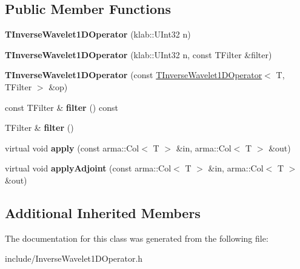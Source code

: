 \subsection*{Public Member Functions}
\begin{DoxyCompactItemize}
\item 
{\bfseries T\+Inverse\+Wavelet1\+D\+Operator} (klab\+::\+U\+Int32 n)\hypertarget{classkl1p_1_1TInverseWavelet1DOperator_aafb2a8284afd6de69ebaf2a465cd88ba}{}\label{classkl1p_1_1TInverseWavelet1DOperator_aafb2a8284afd6de69ebaf2a465cd88ba}

\item 
{\bfseries T\+Inverse\+Wavelet1\+D\+Operator} (klab\+::\+U\+Int32 n, const T\+Filter \&filter)\hypertarget{classkl1p_1_1TInverseWavelet1DOperator_a302bc8fe7d78d336931075f483591779}{}\label{classkl1p_1_1TInverseWavelet1DOperator_a302bc8fe7d78d336931075f483591779}

\item 
{\bfseries T\+Inverse\+Wavelet1\+D\+Operator} (const \hyperlink{classkl1p_1_1TInverseWavelet1DOperator}{T\+Inverse\+Wavelet1\+D\+Operator}$<$ T, T\+Filter $>$ \&op)\hypertarget{classkl1p_1_1TInverseWavelet1DOperator_ac9f909ea169de95fa10ae30df01d214b}{}\label{classkl1p_1_1TInverseWavelet1DOperator_ac9f909ea169de95fa10ae30df01d214b}

\item 
const T\+Filter \& {\bfseries filter} () const \hypertarget{classkl1p_1_1TInverseWavelet1DOperator_a0475beea8d54d65f43d65b6f2b77f559}{}\label{classkl1p_1_1TInverseWavelet1DOperator_a0475beea8d54d65f43d65b6f2b77f559}

\item 
T\+Filter \& {\bfseries filter} ()\hypertarget{classkl1p_1_1TInverseWavelet1DOperator_ae56811b009abdb40f01f91ea0593e862}{}\label{classkl1p_1_1TInverseWavelet1DOperator_ae56811b009abdb40f01f91ea0593e862}

\item 
virtual void {\bfseries apply} (const arma\+::\+Col$<$ T $>$ \&in, arma\+::\+Col$<$ T $>$ \&out)\hypertarget{classkl1p_1_1TInverseWavelet1DOperator_a3776e1dd56a8e1c29a6c634031395105}{}\label{classkl1p_1_1TInverseWavelet1DOperator_a3776e1dd56a8e1c29a6c634031395105}

\item 
virtual void {\bfseries apply\+Adjoint} (const arma\+::\+Col$<$ T $>$ \&in, arma\+::\+Col$<$ T $>$ \&out)\hypertarget{classkl1p_1_1TInverseWavelet1DOperator_acec2a2666d9f34b4705b662720b86737}{}\label{classkl1p_1_1TInverseWavelet1DOperator_acec2a2666d9f34b4705b662720b86737}

\end{DoxyCompactItemize}
\subsection*{Additional Inherited Members}


The documentation for this class was generated from the following file\+:\begin{DoxyCompactItemize}
\item 
include/Inverse\+Wavelet1\+D\+Operator.\+h\end{DoxyCompactItemize}
